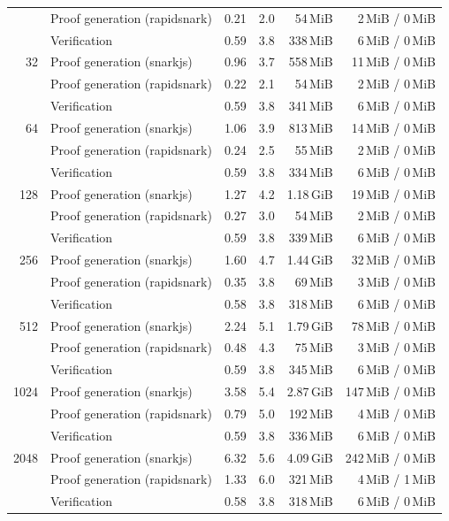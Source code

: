 \begin{table}[t]
{\begin{tabular}{|r|l|r|r|r|r|}
 & Proof generation (rapidsnark) & 0.21 & 2.0 & 54\,MiB & 2\,MiB / 0\,MiB \\
 & Verification & 0.59 & 3.8 & 338\,MiB & 6\,MiB / 0\,MiB \\
\hline
32 & Proof generation (snarkjs) & 0.96 & 3.7 & 558\,MiB & 11\,MiB / 0\,MiB \\
 & Proof generation (rapidsnark) & 0.22 & 2.1 & 54\,MiB & 2\,MiB / 0\,MiB \\
 & Verification & 0.59 & 3.8 & 341\,MiB & 6\,MiB / 0\,MiB \\
\hline
64 & Proof generation (snarkjs) & 1.06 & 3.9 & 813\,MiB & 14\,MiB / 0\,MiB \\
 & Proof generation (rapidsnark) & 0.24 & 2.5 & 55\,MiB & 2\,MiB / 0\,MiB \\
 & Verification & 0.59 & 3.8 & 334\,MiB & 6\,MiB / 0\,MiB \\
\hline
128 & Proof generation (snarkjs) & 1.27 & 4.2 & 1.18\,GiB & 19\,MiB / 0\,MiB \\
 & Proof generation (rapidsnark) & 0.27 & 3.0 & 54\,MiB & 2\,MiB / 0\,MiB \\
 & Verification & 0.59 & 3.8 & 339\,MiB & 6\,MiB / 0\,MiB \\
\hline
256 & Proof generation (snarkjs) & 1.60 & 4.7 & 1.44\,GiB & 32\,MiB / 0\,MiB \\
 & Proof generation (rapidsnark) & 0.35 & 3.8 & 69\,MiB & 3\,MiB / 0\,MiB \\
 & Verification & 0.58 & 3.8 & 318\,MiB & 6\,MiB / 0\,MiB \\
\hline
512 & Proof generation (snarkjs) & 2.24 & 5.1 & 1.79\,GiB & 78\,MiB / 0\,MiB \\
 & Proof generation (rapidsnark) & 0.48 & 4.3 & 75\,MiB & 3\,MiB / 0\,MiB \\
 & Verification & 0.59 & 3.8 & 345\,MiB & 6\,MiB / 0\,MiB \\
\hline
1024 & Proof generation (snarkjs) & 3.58 & 5.4 & 2.87\,GiB & 147\,MiB / 0\,MiB \\
 & Proof generation (rapidsnark) & 0.79 & 5.0 & 192\,MiB & 4\,MiB / 0\,MiB \\
 & Verification & 0.59 & 3.8 & 336\,MiB & 6\,MiB / 0\,MiB \\
\hline
2048 & Proof generation (snarkjs) & 6.32 & 5.6 & 4.09\,GiB & 242\,MiB / 0\,MiB \\
 & Proof generation (rapidsnark) & 1.33 & 6.0 & 321\,MiB & 4\,MiB / 1\,MiB \\
 & Verification & 0.58 & 3.8 & 318\,MiB & 6\,MiB / 0\,MiB \\

\end{tabular}}
\end{table}
